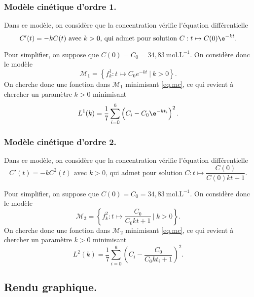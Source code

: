 \subsubsection{Modèle cinétique d'ordre 1.}

Dans ce modèle, on considère que la concentration vérifie l'équation différentielle 
\begin{equation*}
   C'(t) = -k C(t) \textrm{ avec }k>0 \textrm{, qui admet pour solution } C:t\mapsto C(0) \e^{-kt}.
\end{equation*}

Pour simplifier, on suppose que $C(0) = C_0 = 34,83~\textrm{mol}.\textrm{L}^{-1}$. On considère donc le modèle
\begin{equation*}
  \mathscr{M}_1 = \left\{ f^1_k :t\mapsto C_0 e^{-kt} ~\big|~ k>0 \right\}.   
\end{equation*}
On cherche donc une fonction dans $\mathscr{M}_1$ minimisant \eqref{eq.mc}, ce qui revient à chercher un paramètre $k>0$ minimisant 
\begin{equation*}
  L^1(k) = \dfrac{1}{7} \sum_{i=0}^6 \left(C_i - C_0 \e^{-k t_i}\right)^2.
\end{equation*}

\subsubsection{Modèle cinétique d'ordre 2.}

Dans ce modèle, on considère que la concentration vérifie l'équation différentielle 
\begin{equation*}
   C'(t) = -k C^2(t) \textrm{ avec }k>0 \textrm{, qui admet pour solution } C:t\mapsto \dfrac{C(0)}{C(0)kt + 1}.
\end{equation*}

Pour simplifier, on suppose que $C(0) = C_0 = 34,83~\textrm{mol}.\textrm{L}^{-1}$. On considère donc le modèle
\begin{equation*}
  \mathscr{M}_2 = \left\{ f^2_k :t\mapsto  \dfrac{C_0}{C_0kt + 1} ~\big|~ k>0 \right\}.   
\end{equation*}
On cherche donc une fonction dans $\mathscr{M}_2$ minimisant \eqref{eq.mc}, ce qui revient à chercher un paramètre $k>0$ minimisant 
\begin{equation*}
  L^2(k) = \dfrac{1}{7} \sum_{i=0}^6 \left(C_i -\dfrac{C_0}{C_0kt_i + 1}\right)^2.
\end{equation*}

\subsection{Rendu graphique.}


